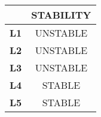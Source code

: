 \begin{table}[htbp]
\centering
\begin{tabular}{|c|c|}
 \hline
 {} & \textbf{STABILITY} \\ [0.5ex]
 \hline
 \textbf{L1} & UNSTABLE \\
 \hline
 \textbf{L2} & UNSTABLE \\
 \hline
 \textbf{L3} & UNSTABLE \\
 \hline
 \textbf{L4} & STABLE \\
 \hline
 \textbf{L5} & STABLE \\
 \hline
\end{tabular}
\label{tab:stability}
\end{table}